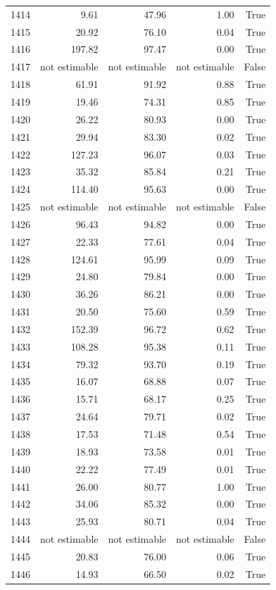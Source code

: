 \begin{longtable}{rrrrr}
1414 & 9.61 & 47.96 & 1.00 & True \\
1415 & 20.92 & 76.10 & 0.04 & True \\
1416 & 197.82 & 97.47 & 0.00 & True \\
1417 & not estimable & not estimable & not estimable & False \\
1418 & 61.91 & 91.92 & 0.88 & True \\
1419 & 19.46 & 74.31 & 0.85 & True \\
1420 & 26.22 & 80.93 & 0.00 & True \\
1421 & 29.94 & 83.30 & 0.02 & True \\
1422 & 127.23 & 96.07 & 0.03 & True \\
1423 & 35.32 & 85.84 & 0.21 & True \\
1424 & 114.40 & 95.63 & 0.00 & True \\
1425 & not estimable & not estimable & not estimable & False \\
1426 & 96.43 & 94.82 & 0.00 & True \\
1427 & 22.33 & 77.61 & 0.04 & True \\
1428 & 124.61 & 95.99 & 0.09 & True \\
1429 & 24.80 & 79.84 & 0.00 & True \\
1430 & 36.26 & 86.21 & 0.00 & True \\
1431 & 20.50 & 75.60 & 0.59 & True \\
1432 & 152.39 & 96.72 & 0.62 & True \\
1433 & 108.28 & 95.38 & 0.11 & True \\
1434 & 79.32 & 93.70 & 0.19 & True \\
1435 & 16.07 & 68.88 & 0.07 & True \\
1436 & 15.71 & 68.17 & 0.25 & True \\
1437 & 24.64 & 79.71 & 0.02 & True \\
1438 & 17.53 & 71.48 & 0.54 & True \\
1439 & 18.93 & 73.58 & 0.01 & True \\
1440 & 22.22 & 77.49 & 0.01 & True \\
1441 & 26.00 & 80.77 & 1.00 & True \\
1442 & 34.06 & 85.32 & 0.00 & True \\
1443 & 25.93 & 80.71 & 0.04 & True \\
1444 & not estimable & not estimable & not estimable & False \\
1445 & 20.83 & 76.00 & 0.06 & True \\
1446 & 14.93 & 66.50 & 0.02 & True \\

\end{longtable}
